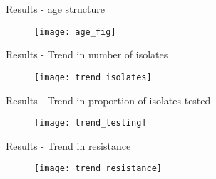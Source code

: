 \documentclass{beamer}
\begin{document}
\begin{frame}{Results - age structure}
\begin{figure}
\texttt{[image: age\_fig]}
\end{figure}
\end{frame}

\begin{frame}{Results - Trend in number of isolates}
\begin{figure}
\texttt{[image: trend\_isolates]}
\end{figure}
\end{frame}

\begin{frame}{Results - Trend in proportion of isolates tested}
\begin{figure}
\texttt{[image: trend\_testing]}
\end{figure}
\end{frame}

\begin{frame}{Results - Trend in resistance} 
\begin{figure}
\texttt{[image: trend\_resistance]}
\end{figure}
\end{frame}
\end{document}
